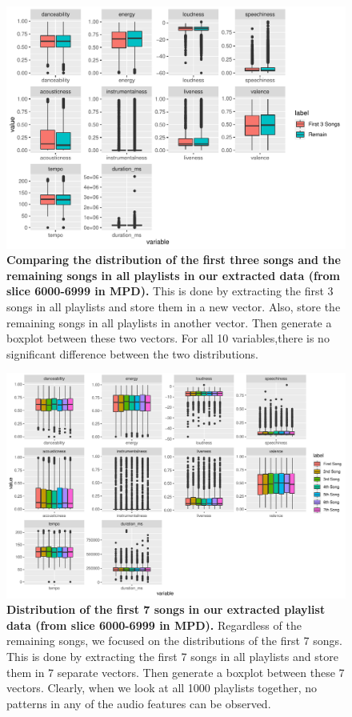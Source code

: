 \documentclass[12pt]{article}
\theoremstyle{plain}
\theoremstyle{definition}
\theoremstyle{remark}
\begin{document}
\begin{figure}[htp]
    \centering
    \includegraphics[width=\textwidth]{Images/1st3.pdf}
    \caption{\textbf{Comparing the distribution of the first three songs and the remaining songs in all playlists in our extracted data (from slice 6000-6999 in MPD).} This is done by extracting the first 3 songs in all playlists and store them in a new vector. Also, store the remaining songs in all playlists in another vector. Then generate a boxplot between these two vectors. For all 10 variables,there is no significant difference between the two distributions.}
    \label{fig:1st3}
\end{figure}

\newpage
\begin{figure}[h]
    \centering
    \includegraphics[width=\textwidth]{Images/1st7.pdf}
    \caption{\textbf{Distribution of the first 7 songs in our extracted playlist data (from slice 6000-6999 in MPD).} Regardless of the remaining songs, we focused on the distributions of the first 7 songs. This is done by extracting the first 7 songs in all playlists and store them in 7 separate vectors. Then generate a boxplot between these 7 vectors. Clearly, when we look at all 1000 playlists together, no patterns in any of the audio features can be observed.}
    \label{fig:1st7}
\end{figure}
\end{document}
